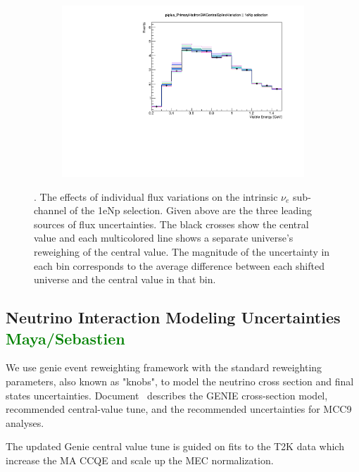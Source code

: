 \documentclass[a4paper]{article}
\begin{document}
\begin{figure}[ht]
\begin{center}
\begin{subfigure}[b]{0.33\textwidth}
    \end{subfigure}
    \begin{subfigure}[b]{0.33\textwidth}
    \centering
    \includegraphics[width=1.00\textwidth]{systvariations/Variation_nue_reco_e_genietune_run1_fluxonly_piplus_PrimaryHadronSWCentralSplineVariation_nu_uBooNE_nue_intrinsic.pdf}
    \end{subfigure}
\caption{\label{fig:fluxsystvars}. The effects of individual flux variations on the intrinsic $\nu_e$ sub-channel of the 1eNp selection. Given above are the three leading sources of flux uncertainties. The black crosses show the central value and each multicolored line shows a separate universe's reweighing of the central value. The magnitude of the  uncertainty in each bin corresponds to the average difference between each shifted universe and the central value in that bin.}
\end{center}
\end{figure}

\subsection{Neutrino Interaction Modeling Uncertainties \textcolor{green}{Maya/Sebastien}}
We use genie event reweighting framework with the standard reweighting parameters, also known as "knobs", to model the neutrino cross section and final states uncertainties. Document~\cite{bib:geniesupportnote} describes the GENIE cross-section model, recommended central-value tune, and the recommended uncertainties for MCC9 analyses. 

The updated Genie central value tune is guided on fits to the T2K data which increase the MA CCQE and scale up the MEC normalization.
\end{document}
